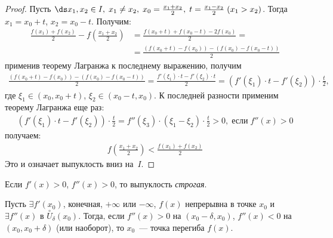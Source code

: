 \begin{proof}
Пусть \(\ds x_1, x_2 \in I, \; x_1 \neq x_2, \; x_0 = \frac{x_1 + x_2}{2}, \; t = \frac{x_1-x_2}{2}
\; (x_1 > x_2)\). Тогда \(x_1 = x_0 + t\), \(x_2 = x_0 - t\). Получим:
\begin{align}
    \frac{f(x_1) + f(x_2)}{2} - f\left(\frac{x_1 + x_2}{2}\right) &= \frac{f(x_0 + t) + f(x_0 - t) -
        2f(x_0)}{2} =\\
    &= \frac{\left(f(x_0 + t) - f(x_0)\right) - \left(f(x_0) - f(x_0 - t)\right)}{2}
\end{align}
применив теорему Лагранжа к последнему выражению, получим
\begin{gather}
    \frac{\left(f(x_0 + t) - f(x_0)\right) - \left(f(x_0) - f(x_0 - t)\right)}{2} = \frac{f'(\xi_1)
        \cdot t - f'(\xi_2) \cdot t}{2} = \left(f'(\xi_1) \cdot t - f'(\xi_2)\right) \cdot
        \frac{t}{2},
\end{gather}
где \(\xi_1 \in (x_0, x_0 + t)\), \(\xi_2 \in (x_0 - t, x_0)\). К последней разности применим
теорему Лагранжа еще раз:
\begin{gather}
    \left(f'(\xi_1) \cdot t - f'(\xi_2)\right) \cdot \frac{t}{2} = f''(\xi_3) \cdot (\xi_1-\xi_2)
        \cdot \frac{t}{2} >0, \; \text{если} \; f''(x) > 0
\end{gather}
получаем:
\begin{gather}
    f\left(\frac{x_1 + x_2}{2}\right) < \frac{f(x_1) + f(x_2)}{2}
\end{gather}
Это и означает выпуклость вниз на~\(I\).
\end{proof}

\begin{note}
Если \(f'(x) > 0\), \(f''(x) > 0\), то выпуклость \textit{строгая}.
\end{note}

\begin{theorem}
Пусть \(\exists f'(x_0)\), конечная, \(+ \infty\) или \(- \infty\), \(f(x)\) непрерывна в точке
\(x_0\) и \(\exists f''(x)\) в \(\overset{\circ}{U}_{\delta} (x_0)\). Тогда, если \(f''(x) > 0\) на
\((x_0 - \delta, x_0)\), \(f''(x) < 0\) на \((x_0, x_0 + \delta)\) (или наоборот), то \(x_0\)~---
точка перегиба \(f(x)\).
\end{theorem}

